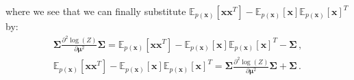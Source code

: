 where we see that we can finally substitute $\mathds{E}_{p(\mathbf{x})}[\mathbf{x}\mathbf{x}^T] - \mathds{E}_{p(\mathbf{x})}[\mathbf{x}] \mathds{E}_{p(\mathbf{x})}[\mathbf{x}]^T$ by:
\begin{align}
\boldsymbol{\Sigma} \frac{\partial^2 \log (Z)}{\partial \boldsymbol{\mu}^2} \boldsymbol{\Sigma} =  \mathds{E}_{p(\mathbf{x})}[\mathbf{x}\mathbf{x}^T] - \mathds{E}_{p(\mathbf{x})}[\mathbf{x}] \mathds{E}_{p(\mathbf{x})}[\mathbf{x}]^T - \boldsymbol{\Sigma}  \nonumber \,, \\
\mathds{E}_{p(\mathbf{x})}[\mathbf{x}\mathbf{x}^T] - \mathds{E}_{p(\mathbf{x})}[\mathbf{x}] \mathds{E}_{p(\mathbf{x})}[\mathbf{x}]^T =  \boldsymbol{\Sigma} \frac{\partial^2 \log (Z)}{\partial \boldsymbol{\mu}^2} \boldsymbol{\Sigma} + \boldsymbol{\Sigma} \,. 
\end{align}
